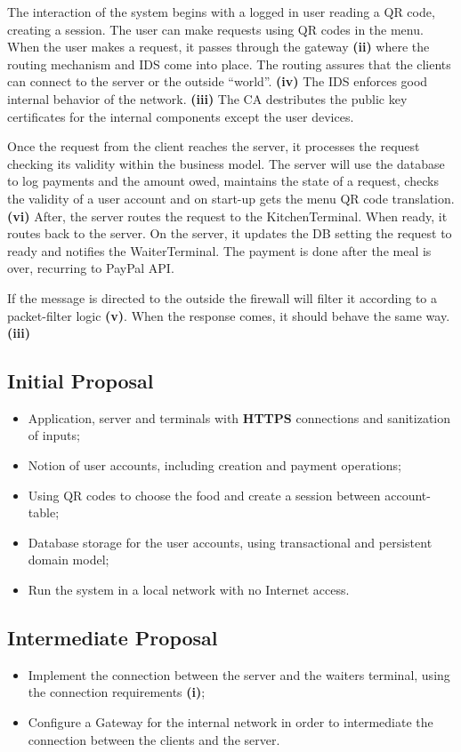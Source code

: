 \documentclass[12pt,paper=a4]{article}
\begin{document}
The interaction of the system begins with a logged in user reading a QR code, creating a session. The user can make requests using QR codes in the menu. When the user makes a request, it passes through the gateway \textbf{(ii)} where the routing mechanism and IDS come into place. The routing assures that the clients can connect to the server or the outside “world”. \textbf{(iv)} The IDS enforces good internal behavior of the network. \textbf{(iii)} The CA destributes the public key certificates for the internal components except the user devices.

Once the request from the client reaches the server, it processes the request checking its validity within the business model. The server will use the database to log payments and the amount owed, maintains the state of a request, checks the validity of a user account and on start-up gets the menu QR code translation. \textbf{(vi)} After, the server routes the request to the KitchenTerminal. When ready, it routes back to the server. On the server, it updates the DB setting the request to ready and notifies the WaiterTerminal. The payment is done after the meal is over, recurring to PayPal API.

If the message is directed to the outside the firewall will filter it according to a packet-filter logic \textbf{(v)}. When the response comes, it should behave the same way. \textbf{(iii)}

\subsection{Initial Proposal}
\begin{itemize}
\item[\ding{51}] Application, server and terminals with \textbf{HTTPS} connections and sanitization of inputs;
\item[\ding{51}] Notion of user accounts, including creation and payment operations;
\item[\ding{51}] Using QR codes to choose the food and create a session between account-table;
\item[\ding{51}] Database storage for the user accounts, using transactional and persistent domain model;
\item[\ding{51}] Run the system in a local network with no Internet access.
\end{itemize}

\subsection{Intermediate Proposal}
\begin{itemize}
\item[\ding{51}] Implement the connection between the server and the waiters terminal, using the connection requirements \textbf{(i)};
\item[\ding{51}] Configure a Gateway for the internal network in order to intermediate the connection between the clients and the server.
\end{itemize}
\end{document}
